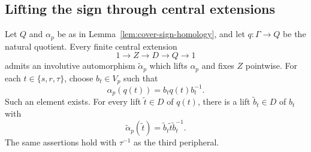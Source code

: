 \subsection{Lifting the sign through central extensions}

\begin{lemma}\label{lem:sign-central-extensions}
Let $Q$ and $\alpha_p$ be as in
Lemma~\ref{lem:cover-sign-homology}, and let $q:\Gamma\to Q$ be the
natural quotient. Every finite central extension
\[
 1\longrightarrow Z\longrightarrow D\longrightarrow Q
       \longrightarrow1
\]
admits an involutive automorphism $\widetilde\alpha_p$ which lifts
$\alpha_p$ and fixes $Z$ pointwise.
For each $t\in\{s,r,\tau\}$, choose $b_t\in V_p$ such that
\[
 \alpha_p(q(t))=b_tq(t)b_t^{-1}.
\]
Such an element exists. For every lift $\widetilde t\in D$ of
$q(t)$, there is a lift $\widetilde b_t\in D$ of $b_t$ with
\[
 \widetilde\alpha_p(\widetilde t)
      =\widetilde b_t\widetilde t\widetilde b_t^{-1}.
\]
The same assertions hold with $\tau^{-1}$ as the third peripheral.
\end{lemma}

